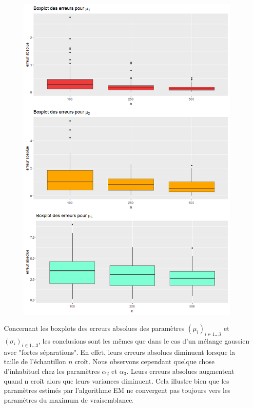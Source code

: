 \documentclass[frenchb]{report}
\newcommand{\1}{\mathbbm{1}}
\theoremstyle{definition}\newtheorem{defn}{Définition}
\theoremstyle{definition}\newtheorem{exm}{Exemple}
\theoremstyle{definition}\newtheorem{nota}{Notation}
\theoremstyle{definition}\newtheorem{rem}{Remarque}
\begin{document}
\begin{figure}[htp]
{		\includegraphics[scale=0.35]{images/bad_mu.png}%
		\label{fig:d}%
	}%
\end{figure}

Concernant les boxplots des erreurs absolues des paramètres $(\mu_{i})_{i \in 1 \dots 3}$ et $(\sigma_i)_{i \in 1 \dots 3}$, les conclusions sont les mêmes que dans le cas d'un mélange gaussien avec "fortes séparations". En effet, leurs erreurs absolues diminuent lorsque la taille de l'échantillon $n$ croît. Nous observons cependant quelque chose d'inhabituel chez les paramètres $\alpha_2$ et $\alpha_3$. Leurs erreurs absolues augmentent quand n croît alors que leurs variances diminuent. Cela illustre bien que les paramètres estimés par l'algorithme EM ne convergent pas toujours vers les paramètres du maximum de vraisemblance.
\end{document}
